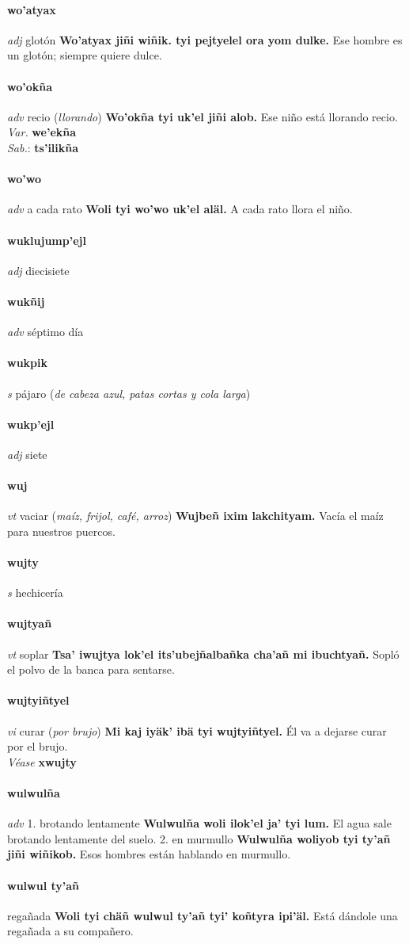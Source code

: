 \documentclass{scrbook}
\newcommand{\entry}[1]{\paragraph{#1}}
\newcommand{\onedefinition}[1]{#1.}
\newcommand{\partofspeech}[1]{\textit{#1}}
\newcommand{\spanishtranslation}[1]{#1}
\newcommand{\clarification}[1]{(\textit{#1})}
\newcommand{\cholexample}[1]{\textbf{#1}}
\newcommand{\exampletranslation}[1]{#1}
\newcommand{\dialectvariant}[1]{\\\textit{#1}:}
\newcommand{\dialectword}[1]{\textbf{#1}}
\newcommand{\alsosee}[1]{\\\textit{Véase} \textbf{#1}}
\newcommand{\variation}[1]{\textit{Var.} \textbf{#1}}
\begin{document}
\begin{multicols}{2}
\entry{wo'atyax}
\partofspeech{adj}
\spanishtranslation{glotón}
\cholexample{Wo'atyax jiñi wiñik. tyi pejtyelel ora yom dulke.}
\exampletranslation{Ese hombre es un glotón; siempre quiere dulce.}

\entry{wo'okña}
\partofspeech{adv}
\spanishtranslation{recio}
\clarification{llorando}
\cholexample{Wo'okña tyi uk'el jiñi alob.}
\exampletranslation{Ese niño está llorando recio.}
\variation{we'ekña}
\dialectvariant{Sab.}
\dialectword{ts'ilikña}

\entry{wo'wo}
\partofspeech{adv}
\spanishtranslation{a cada rato}
\cholexample{Woli tyi wo'wo uk'el aläl.}
\exampletranslation{A cada rato llora el niño.}

\entry{wuklujump'ejl}
\partofspeech{adj}
\spanishtranslation{diecisiete}

\entry{wukñij}
\partofspeech{adv}
\spanishtranslation{séptimo día}

\entry{wukpik}
\partofspeech{s}
\spanishtranslation{pájaro}
\clarification{de cabeza azul, patas cortas y cola larga}

\entry{wukp'ejl}
\partofspeech{adj}
\spanishtranslation{siete}

\entry{wuj}
\partofspeech{vt}
\spanishtranslation{vaciar}
\clarification{maíz, frijol, café, arroz}
\cholexample{Wujbeñ ixim lakchityam.}
\exampletranslation{Vacía el maíz para nuestros puercos.}

\entry{wujty}
\partofspeech{s}
\spanishtranslation{hechicería}

\entry{wujtyañ}
\partofspeech{vt}
\spanishtranslation{soplar}
\cholexample{Tsa' iwujtya lok'el its'ubejñalbañka cha'añ mi ibuchtyañ.}
\exampletranslation{Sopló el polvo de la banca para sentarse.}

\entry{wujtyiñtyel}
\partofspeech{vi}
\spanishtranslation{curar}
\clarification{por brujo}
\cholexample{Mi kaj iyäk' ibä tyi wujtyiñtyel.}
\exampletranslation{Él va a dejarse curar por el brujo.}
\alsosee{xwujty}

\entry{wulwulña}
\partofspeech{adv}
\onedefinition{1}
\spanishtranslation{brotando lentamente}
\cholexample{Wulwulña woli ilok'el ja' tyi lum.}
\exampletranslation{El agua sale brotando lentamente del suelo.}
\onedefinition{2}
\spanishtranslation{en murmullo}
\cholexample{Wulwulña woliyob tyi ty'añ jiñi wiñikob.}
\exampletranslation{Esos hombres están hablando en murmullo.}

\entry{wulwul ty'añ}
\spanishtranslation{regañada}
\cholexample{Woli tyi chäñ wulwul ty'añ tyi' koñtyra ipi'äl.}
\exampletranslation{Está dándole una regañada a su compañero.}


\end{multicols}
\end{document}
